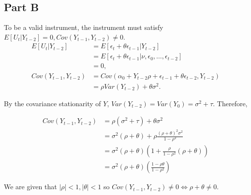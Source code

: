 \documentclass[11pt]{article} %
\begin{document}
\subsection{Part B}
To be a valid instrument, the instrument must satisfy $E[U_t|Y_{t-2}] = 0, Cov(Y_{t-1},Y_{t-2})\neq0$.
\begin{align*}
E[U_t|Y_{t-2}] &= E[\epsilon_t + \theta\epsilon_{t-1}|Y_{t-2}]\\
&= E[\epsilon_t + \theta\epsilon_{t-1}|\nu,\epsilon_0,\dots,\epsilon_{t-2}]\\
&= 0,\\
 Cov(Y_{t-1},Y_{t-2}) &= Cov(\alpha_0 + Y_{t-2}\rho +\epsilon_{t-1} + \theta \epsilon_{t-2},Y_{t-2})\\
&= \rho Var(Y_{t-2}) +\theta \sigma^2.
\end{align*}

By the covariance stationarity of $Y$, $Var(Y_{t-2}) = Var(Y_0) = \sigma^2 +\tau.$ Therefore,

\begin{align*}
 Cov(Y_{t-1},Y_{t-2}) &=\rho ( \sigma^2 +\tau) +\theta \sigma^2\\
&= \sigma^2(\rho +\theta)  + \rho\frac{(\rho + \theta)^2\sigma^2}{1-\rho^2}\\
&= \sigma^2(\rho +\theta)\left( 1 + \frac{\rho}{1-\rho^2}(\rho + \theta) \right) \\
&= \sigma^2(\rho +\theta)\left( \frac{1-\rho\theta}{1-\rho^2} \right)
\end{align*}

We are given that $|\rho|<1,|\theta|<1$ so $Cov(Y_{t-1},Y_{t-2})  \neq 0 \iff \rho+\theta \neq 0.$
\end{document}
